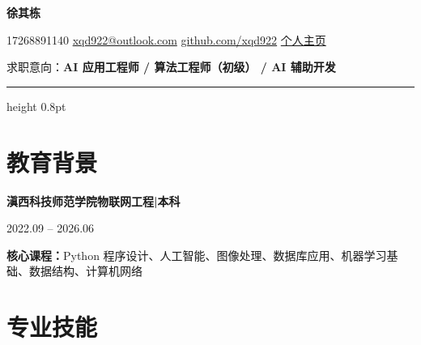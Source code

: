 \documentclass[10pt,a4paper]{article}
\begin{document}
\begin{center}
    {\fontsize{26}{32}\selectfont\bfseries\color{primary} 徐其栋}

    \vspace{0.15em}

    {\color{graytext}
    \faPhone\hspace{0.3em}17268891140
    \hspace{1.0em}
    \faEnvelope\hspace{0.3em}\href{mailto:xqd922@outlook.com}{xqd922@outlook.com}
    \hspace{1.0em}
    \faGithub\hspace{0.3em}\href{https://github.com/xqd922}{github.com/xqd922}
    \hspace{1.0em}
    \faGlobe\hspace{0.3em}\href{https://1001.pp.ua}{个人主页}}

    \vspace{0.5em}

    {\color{darktext} 求职意向：\textbf{\color{primary}AI 应用工程师 / 算法工程师（初级） / AI 辅助开发}}
\end{center}

\vspace{0.2em}
{\color{rulecolor}\hrule height 0.8pt}

\section{\faGraduationCap\hspace{0.4em}教育背景}

{\bfseries 滇西科技师范学院}\hfill{\bfseries 物联网工程\hspace{0.3em}|\hspace{0.3em}本科}

{\color{graytext} 2022.09 -- 2026.06}

\vspace{0.2em}

{\color{darktext}
\textbf{核心课程：}Python 程序设计、人工智能、图像处理、数据库应用、机器学习基础、数据结构、计算机网络
}

\section{\faCogs\hspace{0.4em}专业技能}
\end{document}

